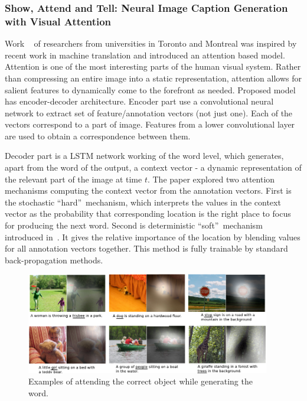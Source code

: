 \subsubsection{Show, Attend and Tell: Neural Image Caption Generation with Visual Attention}

Work ~\cite{DBLP:journals/corr/XuBKCCSZB15} of researchers from universities in Toronto and Montreal was inspired by recent work in machine translation and introduced an attention based model. Attention is one of the most interesting parts of the human visual system. Rather than compressing an entire image into a static representation, attention allows for salient features to dynamically come to the forefront as needed. Proposed model has encoder-decoder architecture. Encoder part use a convolutional neural network to extract set of feature/annotation vectors (not just one). Each of the vectors correspond to a part of image. Features from a lower convolutional layer are used to obtain a correspondence between them.

Decoder part is a LSTM network working of the word level, which generates, apart from the word of the output, a context vector - a dynamic representation of the relevant part of the image at time $ t $. The paper explored two attention mechanisms computing the context vector from the annotation vectors. First is the stochastic \textquotedblleft hard\textquotedblright\ mechanism, which interprets the values in the context vector as the probability that corresponding location is the right place to focus for producing the next word. Second is deterministic \textquotedblleft soft\textquotedblright\ mechanism introduced in~\cite{DBLP:journals/corr/BahdanauCB14}. It gives the relative importance of the location by blending values for all annotation vectors together. This method is fully trainable by standard back-propagation methods.

\begin{figure}[!t]
	\centering
	\includegraphics[width=0.95\textwidth]{./fig/show-attend-tell_example-correct.pdf}
	\caption{Examples of attending the correct object while generating the word.~\cite{DBLP:journals/corr/XuBKCCSZB15}
		\label{fig:attendmodelcorrect}}
\end{figure}

